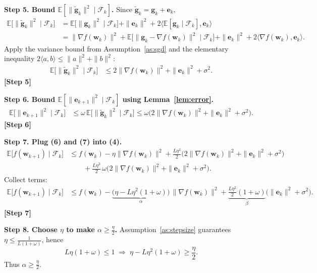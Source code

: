 \documentclass{article}
\newcommand{\E}{\mathbb{E}}
\newcommand{\ip}[2]{\langle #1,#2\rangle}
\begin{document}
\noindent\textbf{Step 5. Bound $\E[\|\tilde{\bm g}_k\|^2\mid\mathcal F_k]$.}  
Since $\tilde{\bm g}_k=\bm g_k+\bm e_k$,
\begin{align}
\E\!\big[\|\tilde{\bm g}_k\|^2\mid\mathcal F_k\big]
&= \E\!\big[\|\bm g_k\|^2\mid\mathcal F_k\big] + \|\bm e_k\|^2
   +2\ip{\E[\bm g_k\mid\mathcal F_k]}{\bm e_k} \nonumber\\
&= \|\nabla f(\bm w_k)\|^2 + \E\!\big[\|\bm g_k-\nabla f(\bm w_k)\|^2\mid\mathcal F_k\big]
   + \|\bm e_k\|^2 + 2\ip{\nabla f(\bm w_k)}{\bm e_k} .
\tag{5}
\end{align}
Apply the variance bound from Assumption~\ref{as:sgd} and the elementary inequality $2\ip{a}{b}\le \|a\|^2+\|b\|^2$:
\begin{align}
\E\!\big[\|\tilde{\bm g}_k\|^2\mid\mathcal F_k\big]
&\le 2\|\nabla f(\bm w_k)\|^2 + \|\bm e_k\|^2 + \sigma^2 .
\tag{6}
\end{align}
\textbf{[Step 5]}

\noindent\textbf{Step 6. Bound $\E[\|\bm e_{k+1}\|^2\mid\mathcal F_k]$ using Lemma~\ref{lem:error}.}
\begin{align}
\E\!\big[\|\bm e_{k+1}\|^2\mid\mathcal F_k\big]
&\le \omega\,\E\!\big[\|\tilde{\bm g}_k\|^2\mid\mathcal F_k\big]
\le \omega\big(2\|\nabla f(\bm w_k)\|^2 + \|\bm e_k\|^2 + \sigma^2\big) .
\tag{7}
\end{align}
\textbf{[Step 6]}

\noindent\textbf{Step 7. Plug (6) and (7) into (4).}
\begin{align}
\E\!\big[f(\bm w_{k+1})\mid\mathcal F_k\big]
&\le f(\bm w_k) -\eta\|\nabla f(\bm w_k)\|^2
   +\frac{L\eta^2}{2}\big(2\|\nabla f(\bm w_k)\|^2 + \|\bm e_k\|^2 + \sigma^2\big) \nonumber\\
&\qquad +\frac{L\eta^2}{2}\,\omega\big(2\|\nabla f(\bm w_k)\|^2 + \|\bm e_k\|^2 + \sigma^2\big) .
\tag{8}
\end{align}
Collect terms:
\begin{align}
\E\!\big[f(\bm w_{k+1})\mid\mathcal F_k\big]
&\le f(\bm w_k) 
   -\underbrace{\big(\eta -L\eta^2(1+\omega)\big)}_{\displaystyle \alpha}\,\|\nabla f(\bm w_k)\|^2
   +\underbrace{\frac{L\eta^2}{2}(1+\omega)}_{\displaystyle \beta}\big(\|\bm e_k\|^2+\sigma^2\big) .
\tag{9}
\end{align}
\textbf{[Step 7]}

\noindent\textbf{Step 8. Choose $\eta$ to make $\alpha\ge \frac{\eta}{2}$.}  
Assumption~\ref{as:stepsize} guarantees $\eta\le\frac{1}{L(1+\omega)}$, hence
\[
L\eta(1+\omega)\le 1\;\Longrightarrow\; \eta - L\eta^2(1+\omega) \ge \frac{\eta}{2}.
\tag{10}
\]
Thus $\alpha\ge \frac{\eta}{2}$.
\end{document}
